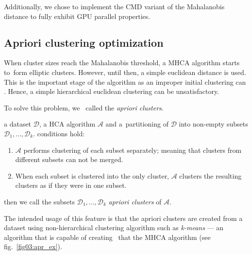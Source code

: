 Additionally, we chose to implement the CMD variant of the Mahalanobis distance to fully exhibit GPU parallel properties.

\subsection{Apriori clustering optimization}

When cluster sizes reach the Mahalanobis threshold, a MHCA algorithm starts to~form elliptic clusters. However, until then, a simple euclidean distance is used. This is the important stage of the algorithm as an improper initial clustering can . Hence, a simple hierarchical euclidean clustering can be unsatisfactory.

To solve this problem, we \ called the \emph{apriori clusters}. 

\begin{defn}
	 a dataset $\mathcal{D}$, a HCA algorithm $\mathcal{A}$ and a~partitioning of  $\mathcal{D}$ into non-empty subsets $\mathcal{D}_1,\dots,\mathcal{D}_k$.  conditions hold:
	\begin{enumerate}
		\item $\mathcal{A}$ performs clustering of each subset separately; meaning that clusters from different subsets can not be merged.
		\item When each subset is clustered into the only cluster, $\mathcal{A}$ clusters the resulting clusters as if they were in one subset.
	\end{enumerate}
	then we call the subsets $\mathcal{D}_1,\dots,\mathcal{D}_k$ \emph{apriori clusters} of $\mathcal{A}$.
	\label{def03:apriori}
\end{defn}

The intended usage of this feature is that the apriori clusters are created from a dataset using non-hierarchical clustering algorithm such as \emph{k-means} --- an algorithm that is capable of creating \ that the MHCA algorithm (see fig.~\ref{fig03:apr_ex}).

